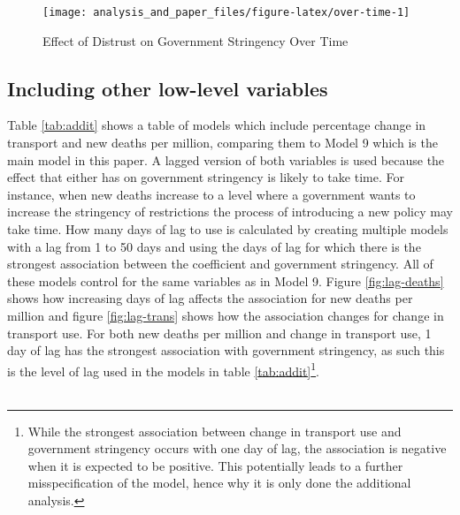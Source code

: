 \documentclass[
  12pt,
]{article}
\begin{document}
\begin{figure}
\texttt{[image: analysis\_and\_paper\_files/figure-latex/over-time-1]} \caption{Effect of Distrust on Government Stringency Over Time}\label{fig:over-time}
\end{figure}

\hypertarget{including-other-low-level-variables}{%
\subsection{Including other low-level variables}\label{including-other-low-level-variables}}

Table \ref{tab:addit} shows a table of models which include percentage change in transport and new deaths per million, comparing them to Model 9 which is the main model in this paper. A lagged version of both variables is used because the effect that either has on government stringency is likely to take time. For instance, when new deaths increase to a level where a government wants to increase the stringency of restrictions the process of introducing a new policy may take time. How many days of lag to use is calculated by creating multiple models with a lag from 1 to 50 days and using the days of lag for which there is the strongest association between the coefficient and government stringency. All of these models control for the same variables as in Model 9. Figure \ref{fig:lag-deaths} shows how increasing days of lag affects the association for new deaths per million and figure \ref{fig:lag-trans} shows how the association changes for change in transport use. For both new deaths per million and change in transport use, 1 day of lag has the strongest association with government stringency, as such this is the level of lag used in the models in table \ref{tab:addit}\footnote{While the strongest association between change in transport use and government stringency occurs with one day of lag, the association is negative when it is expected to be positive. This potentially leads to a further misspecification of the model, hence why it is only done the additional analysis.}.\\
~\\
\end{document}
